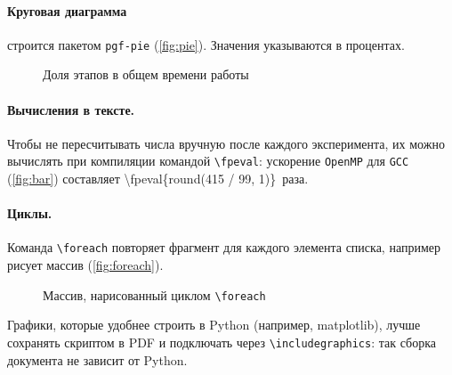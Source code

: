 \paragraph{Круговая диаграмма} строится пакетом \texttt{pgf-pie}
(\autoref{fig:pie}). Значения указываются в процентах.

\begin{figure}[H]
    \centering
    \caption{Доля этапов в общем времени работы}\label{fig:pie}
\end{figure}

\paragraph{Вычисления в тексте.} Чтобы не пересчитывать числа вручную после
каждого эксперимента, их можно вычислять при компиляции командой
\verb+\fpeval+: ускорение \texttt{OpenMP} для \texttt{GCC}
(\autoref{fig:bar}) составляет \num{\fpeval{round(415 / 99, 1)}}~раза.

\paragraph{Циклы.} Команда \verb+\foreach+ повторяет фрагмент для каждого
элемента списка, например рисует массив (\autoref{fig:foreach}).

\begin{figure}[H]
    \centering
    \caption{Массив, нарисованный циклом \texttt{\textbackslash foreach}}\label{fig:foreach}
\end{figure}

Графики, которые удобнее строить в Python (например, matplotlib), лучше
сохранять скриптом в PDF и подключать через \verb+\includegraphics+:
так сборка документа не зависит от Python.
